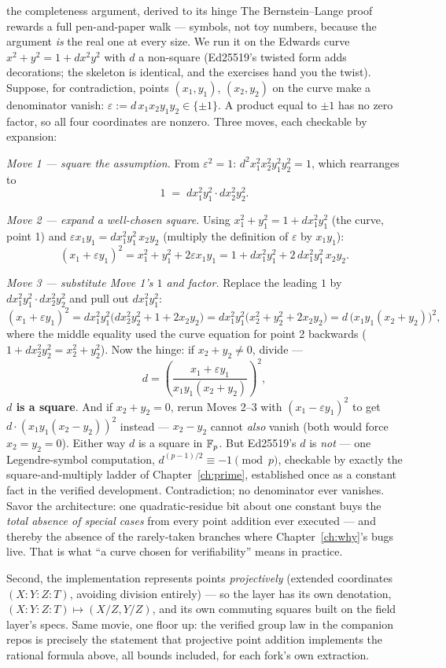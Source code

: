 \begin{worked}{the completeness argument, derived to its hinge}
The Bernstein--Lange proof rewards a full pen-and-paper walk --- symbols,
not toy numbers, because the argument \emph{is} the real one at every
size. We run it on the Edwards curve $x^2 + y^2 = 1 + d x^2 y^2$ with
$d$ a non-square (Ed25519's twisted form adds decorations; the skeleton
is identical, and the exercises hand you the twist). Suppose, for
contradiction, points $(x_1,y_1)$, $(x_2,y_2)$ on the curve make a
denominator vanish: $\varepsilon := d\,x_1 x_2 y_1 y_2 \in \{\pm 1\}$.
A product equal to $\pm 1$ has no zero factor, so all four coordinates
are nonzero. Three moves, each checkable by expansion:

\emph{Move 1 --- square the assumption.} From $\varepsilon^2 = 1$:
$d^2 x_1^2 x_2^2 y_1^2 y_2^2 = 1$, which rearranges to
\[
1 \;=\; d x_1^2 y_1^2 \cdot d x_2^2 y_2^2 .
\]

\emph{Move 2 --- expand a well-chosen square.} Using
$x_1^2 + y_1^2 = 1 + d x_1^2 y_1^2$ (the curve, point 1) and
$\varepsilon x_1 y_1 = d x_1^2 y_1^2\, x_2 y_2$ (multiply the definition
of $\varepsilon$ by $x_1 y_1$):
\[
(x_1 + \varepsilon y_1)^2
= x_1^2 + y_1^2 + 2\varepsilon x_1 y_1
= 1 + d x_1^2 y_1^2 + 2\, d x_1^2 y_1^2\, x_2 y_2 .
\]

\emph{Move 3 --- substitute Move 1's $1$ and factor.} Replace the
leading $1$ by $d x_1^2 y_1^2 \cdot d x_2^2 y_2^2$ and pull out
$d x_1^2 y_1^2$:
\[
(x_1 + \varepsilon y_1)^2
= d x_1^2 y_1^2 \big( d x_2^2 y_2^2 + 1 + 2 x_2 y_2 \big)
= d x_1^2 y_1^2 \big( x_2^2 + y_2^2 + 2 x_2 y_2 \big)
= d\,\big(x_1 y_1 (x_2 + y_2)\big)^2 ,
\]
where the middle equality used the curve equation for point 2 backwards
($1 + d x_2^2 y_2^2 = x_2^2 + y_2^2$). Now the hinge: if
$x_2 + y_2 \neq 0$, divide ---
\[
d = \left( \frac{x_1 + \varepsilon y_1}{x_1 y_1 (x_2 + y_2)} \right)^{2},
\]
\textbf{$d$ is a square}. And if $x_2 + y_2 = 0$, rerun Moves 2--3 with
$(x_1 - \varepsilon y_1)^2$ to get $d \cdot (x_1 y_1 (x_2 - y_2))^2$
instead --- $x_2 - y_2$ cannot \emph{also} vanish (both would force
$x_2 = y_2 = 0$). Either way $d$ is a square in $\mathbb{F}_p$. But Ed25519's $d$
is \emph{not} --- one Legendre-symbol computation,
$d^{(p-1)/2} \equiv -1 \pmod p$, checkable by exactly the
square-and-multiply ladder of Chapter~\ref{ch:prime}, established once
as a constant fact in the verified development. Contradiction; no
denominator ever vanishes. Savor the architecture: one quadratic-residue
bit about one constant buys the \emph{total absence of special cases}
from every point addition ever executed --- and thereby the absence of
the rarely-taken branches where Chapter~\ref{ch:why}'s bugs live. That
is what ``a curve chosen for verifiability'' means in practice.
\end{worked} Second, the implementation
represents points \emph{projectively} (extended coordinates $(X:Y:Z:T)$,
avoiding division entirely) --- so the layer has its own denotation,
$(X:Y:Z:T) \mapsto (X/Z, Y/Z)$, and its own commuting squares built on the
field layer's specs. Same movie, one floor up: the verified group law in the
companion repos is precisely the statement that projective point addition
implements the rational formula above, all bounds included, for each fork's
own extraction.

